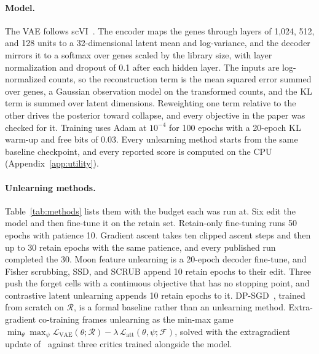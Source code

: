\documentclass{article}
\begin{document}
\paragraph{Model.} The VAE follows scVI~\citep{lopez2018}. The encoder maps the genes through layers of 1,024, 512, and 128 units to a 32-dimensional latent mean and log-variance, and the decoder mirrors it to a softmax over genes scaled by the library size, with layer normalization and dropout of 0.1 after each hidden layer. The inputs are log-normalized counts, so the reconstruction term is the mean squared error summed over genes, a Gaussian observation model on the transformed counts, and the KL term is summed over latent dimensions. Reweighting one term relative to the other drives the posterior toward collapse, and every objective in the paper was checked for it. Training uses Adam at $10^{-4}$ for 100 epochs with a 20-epoch KL warm-up and free bits of 0.03. Every unlearning method starts from the same baseline checkpoint, and every reported score is computed on the CPU (Appendix~\ref{app:utility}).

\paragraph{Unlearning methods.} Table~\ref{tab:methods} lists them with the budget each was run at. Six edit the model and then fine-tune it on the retain set. Retain-only fine-tuning runs 50 epochs with patience 10. Gradient ascent takes ten clipped ascent steps and then up to 30 retain epochs with the same patience, and every published run completed the 30. Moon feature unlearning is a 20-epoch decoder fine-tune, and Fisher scrubbing, SSD, and SCRUB append 10 retain epochs to their edit. Three push the forget cells with a continuous objective that has no stopping point, and contrastive latent unlearning appends 10 retain epochs to it. DP-SGD~\citep{abadi2016}, trained from scratch on $\mathcal{R}$, is a formal baseline rather than an unlearning method. Extra-gradient co-training frames unlearning as the min-max game $\min_\theta \max_\psi \mathcal{L}_{\mathrm{VAE}}(\theta; \mathcal{R}) - \lambda \, \mathcal{L}_{\mathrm{att}}(\theta, \psi; \mathcal{F})$, solved with the extragradient update of~\citet{chavdarova2019} against three critics trained alongside the model.

\begin{table}[t]
\centering
\caption{The methods, grouped by what they do. The budget column gives the budget each method was run with here, including the retain epochs appended to Fisher scrubbing, SSD, SCRUB, and contrastive unlearning, and Table~\ref{tab:hparams} gives the rest of the settings. DP-SGD is not post-hoc; the two constructive approaches are reported in Appendix~\ref{app:utility}; the likelihood-targeted fine-tune of Section~\ref{sec:beyond} is a demonstration that needs a level only a retrained model supplies.}
\label{tab:methods}
\small
\resizebox{\textwidth}{!}{}
\end{table}
\end{document}
